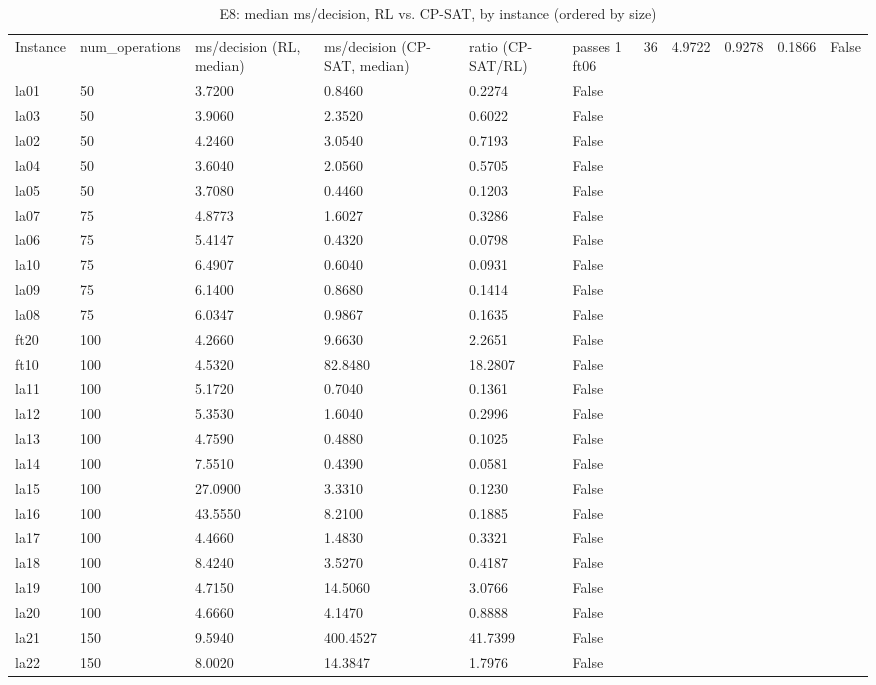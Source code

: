 \begin{table}[htbp]
\centering
\caption{E8: median ms/decision, RL vs. CP-SAT, by instance (ordered by size)}
\label{tab:ch6-e8-latency-summary}
\begin{tabular}{llllll}
\toprule
Instance & num_operations & ms/decision (RL, median) & ms/decision (CP-SAT, median) & ratio (CP-SAT/RL) & passes 1%
\midrule
ft06 & 36 & 4.9722 & 0.9278 & 0.1866 & False \\
la01 & 50 & 3.7200 & 0.8460 & 0.2274 & False \\
la03 & 50 & 3.9060 & 2.3520 & 0.6022 & False \\
la02 & 50 & 4.2460 & 3.0540 & 0.7193 & False \\
la04 & 50 & 3.6040 & 2.0560 & 0.5705 & False \\
la05 & 50 & 3.7080 & 0.4460 & 0.1203 & False \\
la07 & 75 & 4.8773 & 1.6027 & 0.3286 & False \\
la06 & 75 & 5.4147 & 0.4320 & 0.0798 & False \\
la10 & 75 & 6.4907 & 0.6040 & 0.0931 & False \\
la09 & 75 & 6.1400 & 0.8680 & 0.1414 & False \\
la08 & 75 & 6.0347 & 0.9867 & 0.1635 & False \\
ft20 & 100 & 4.2660 & 9.6630 & 2.2651 & False \\
ft10 & 100 & 4.5320 & 82.8480 & 18.2807 & False \\
la11 & 100 & 5.1720 & 0.7040 & 0.1361 & False \\
la12 & 100 & 5.3530 & 1.6040 & 0.2996 & False \\
la13 & 100 & 4.7590 & 0.4880 & 0.1025 & False \\
la14 & 100 & 7.5510 & 0.4390 & 0.0581 & False \\
la15 & 100 & 27.0900 & 3.3310 & 0.1230 & False \\
la16 & 100 & 43.5550 & 8.2100 & 0.1885 & False \\
la17 & 100 & 4.4660 & 1.4830 & 0.3321 & False \\
la18 & 100 & 8.4240 & 3.5270 & 0.4187 & False \\
la19 & 100 & 4.7150 & 14.5060 & 3.0766 & False \\
la20 & 100 & 4.6660 & 4.1470 & 0.8888 & False \\
la21 & 150 & 9.5940 & 400.4527 & 41.7399 & False \\
la22 & 150 & 8.0020 & 14.3847 & 1.7976 & False \\

\end{tabular}
\end{table}
